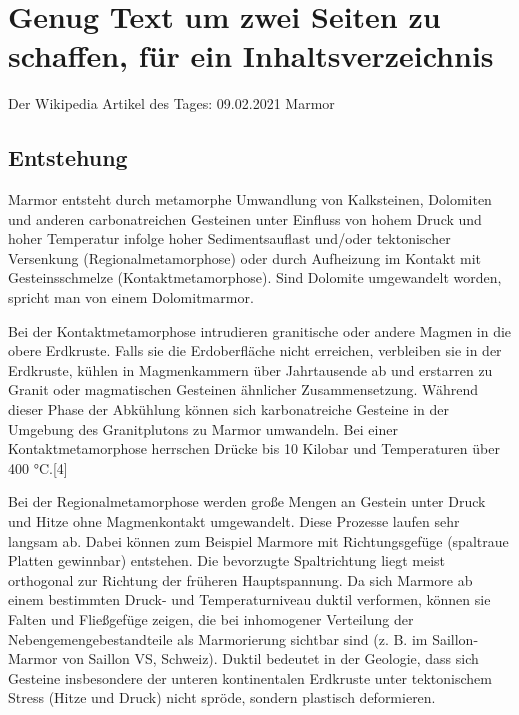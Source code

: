 \documentclass{scrartcl}
\begin{document}
\section{Genug Text um zwei Seiten zu schaffen, für ein Inhaltsverzeichnis}
Der Wikipedia Artikel des Tages: 09.02.2021
Marmor

\subsection{Entstehung}
Marmor entsteht durch metamorphe Umwandlung von Kalksteinen, Dolomiten und anderen carbonatreichen Gesteinen unter Einfluss von hohem Druck und hoher Temperatur infolge hoher Sedimentsauflast und/oder tektonischer Versenkung (Regionalmetamorphose) oder durch Aufheizung im Kontakt mit Gesteinsschmelze (Kontaktmetamorphose). Sind Dolomite umgewandelt worden, spricht man von einem Dolomitmarmor.

Bei der Kontaktmetamorphose intrudieren granitische oder andere Magmen in die obere Erdkruste. Falls sie die Erdoberfläche nicht erreichen, verbleiben sie in der Erdkruste, kühlen in Magmenkammern über Jahrtausende ab und erstarren zu Granit oder magmatischen Gesteinen ähnlicher Zusammensetzung. Während dieser Phase der Abkühlung können sich karbonatreiche Gesteine in der Umgebung des Granitplutons zu Marmor umwandeln. Bei einer Kontaktmetamorphose herrschen Drücke bis 10 Kilobar und Temperaturen über 400 °C.[4]

Bei der Regionalmetamorphose werden große Mengen an Gestein unter Druck und Hitze ohne Magmenkontakt umgewandelt. Diese Prozesse laufen sehr langsam ab. Dabei können zum Beispiel Marmore mit Richtungsgefüge (spaltraue Platten gewinnbar) entstehen. Die bevorzugte Spaltrichtung liegt meist orthogonal zur Richtung der früheren Hauptspannung. Da sich Marmore ab einem bestimmten Druck- und Temperaturniveau duktil verformen, können sie Falten und Fließgefüge zeigen, die bei inhomogener Verteilung der Nebengemengebestandteile als Marmorierung sichtbar sind (z. B. im Saillon-Marmor von Saillon VS, Schweiz). Duktil bedeutet in der Geologie, dass sich Gesteine insbesondere der unteren kontinentalen Erdkruste unter tektonischem Stress (Hitze und Druck) nicht spröde, sondern plastisch deformieren.
\end{document}
